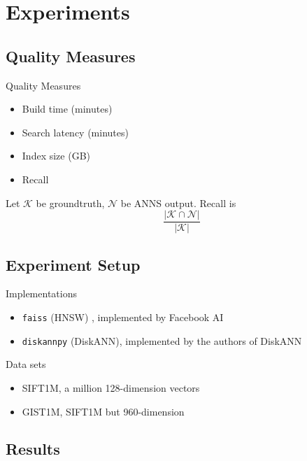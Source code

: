 \chapter{Experiments}

\section{Quality Measures}

{Quality Measures}
\begin{itemize}
    \item Build time (minutes)
    \item Search latency (minutes)
    \item Index size (GB)
    \item Recall
\end{itemize}


\begin{definition}[Recall]
    Let \(\mathcal{K}\) be groundtruth, \(\mathcal{N}\) be ANNS output. Recall is
    \[
        \frac{|\mathcal{K} \cap \mathcal{N}|}{|\mathcal{K}|}
    \]
\end{definition}
% 

\section{Experiment Setup}

Implementations
\begin{itemize}
    \item \texttt{faiss} (HNSW) \cite{faiss-github}, implemented by Facebook AI
    \item \texttt{diskannpy} (DiskANN), implemented by the authors of DiskANN
\end{itemize}

Data sets
\begin{itemize}
    \item SIFT1M, a million 128-dimension vectors
    \item GIST1M, SIFT1M but 960-dimension
\end{itemize}


% 

\section{Results}

